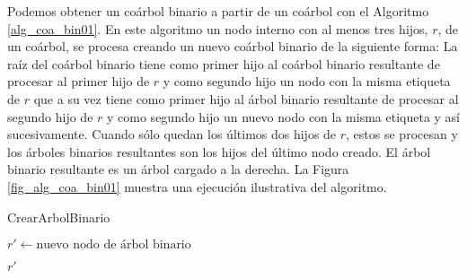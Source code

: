 Podemos obtener un coárbol binario a partir de un coárbol con el Algoritmo \ref{alg_coa_bin01}. En este algoritmo un nodo interno con al menos tres hijos, $r$, de un coárbol, se procesa creando un nuevo coárbol binario de la siguiente forma: La raíz del coárbol binario tiene como primer hijo al coárbol binario resultante de procesar al primer hijo de $r$ y como segundo hijo un nodo con la misma etiqueta de $r$ que a su vez tiene como primer hijo al árbol binario resultante de procesar al segundo hijo de $r$ y como segundo hijo un nuevo nodo con la misma etiqueta y así sucesivamente. Cuando sólo quedan los últimos dos hijos de $r$, estos se procesan y los árboles binarios resultantes son los hijos del último nodo creado. El árbol binario resultante es un árbol cargado a la derecha. La Figura \ref{fig_alg_coa_bin01} muestra una ejecución ilustrativa del algoritmo.

\begin{algorithm}[h]
\caption{CrearArbolBinario}
\label{alg_coa_bin01}
\DontPrintSemicolon %

$r' \gets \text{nuevo nodo de árbol binario}$\;

\Return $r'$\;
    
\end{algorithm}

